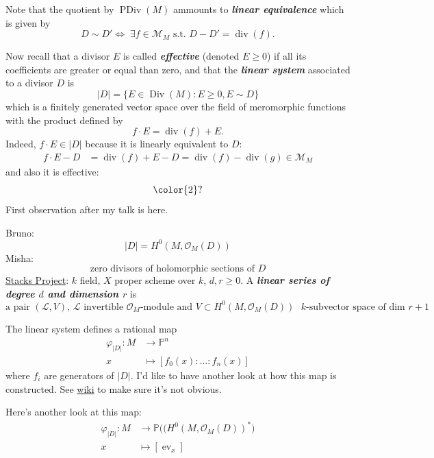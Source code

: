 Note that the quotient by $\operatorname{PDiv}(M)$ ammounts to \textit{\textbf{linear equivalence}} which is given by
\[D\sim D'\iff\;\exists f\in\mathcal{M}_M\text{ s.t. }D-D'=\operatorname{div}(f).\]

Now recall that a divisor $E$ is called \textit{\textbf{effective}} (denoted $E\geq 0$) if all its coefficients are greater or equal than zero, and that the \textit{\textbf{linear system}} associated to a divisor  $D$ is
 \[|D| =\{E\in\operatorname{Div}(M):E\geq 0, E\sim D\}\]
 which is a finitely generated vector space over the field of meromorphic functions with the product defined by
 \[f\cdot E=\operatorname{div}(f)+E.\]
 Indeed, $f\cdot E\in |D|$ because it is linearly equivalent to $D$:
  \begin{align*}
  f\cdot E-D&=\operatorname{div}(f)+E-D=\operatorname{div}(f)-\operatorname{div}(g)\in\mathcal{M}_M
  \end{align*}
and also it is effective:
\[{\color{2}?}\]
{\color{3}First observation after my talk is here.}
\begin{defn}[Linear system=Linear series]\leavevmode
	Bruno:
	\[|D|=H^{0}(M,\mathcal{O}_M(D))\]
	Misha:
	\[\text{zero divisors of holomorphic sections of $D$} \]
	\href{https://stacks.math.columbia.edu/tag/0CCM}{Stacks Project}: $k$ field, $X$ proper scheme over $k$, $d,r\geq 0$. A \textit{\textbf{linear series of degree $d$ and dimension $r$}} is
	\[\text{a pair $(\mathcal{L},V)$, $\mathcal{L}$ invertible $\mathcal{O}_M$-module and $V\subset H^{0}(M,\mathcal{O}_M(D))$ $k$-subvector space of dim $r+1$} \]
\end{defn}

The linear system defines a rational map
\begin{align*}
	\varphi_{|D|}: M &\longrightarrow \mathbb{P}^{n} \\
	x &\longmapsto [f_0(x):\ldots :f_n(x)]
\end{align*}
where $f_i$ are generators of $|D|$. {\color{3}I'd like to have another look at how this map is constructed. See \href{https://en.wikipedia.org/wiki/Linear_system_of_divisors#A_map_determined_by_a_linear_system}{wiki} to make sure it's not obvious.}

Here's another look at this map:
\begin{align*}
	\varphi_{|D|}:M&\longrightarrow \mathbb{P}\big((H^{0}(M,\mathcal{O}_M(D))^*\big) \\
	x &\longmapsto [\operatorname{ev}_x]
\end{align*}

